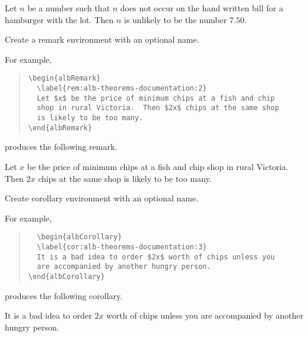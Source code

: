 \documentclass[11pt,a4paper,oneside,titlepage]{alb-corp}
\begin{document}
\begin{description}
  \begin{albLemma}
    \label{lem:alb-theorems-documentation:1}
    Let $n$ be a number such that $n$ does not occur on the hand written
    bill for a hamburger with the lot.  Then $n$ is unlikely to be the
    number $7.50$.
  \end{albLemma}

\item[\albLtxEnv{albRemark}\albLtxOpt{name}] Create a remark environment
  with an optional name.

  For example,
  \begin{quote}
\begin{verbatim}
\begin{albRemark}
  \label{rem:alb-theorems-documentation:2}
  Let $x$ be the price of minimum chips at a fish and chip
  shop in rural Victoria.  Then $2x$ chips at the same shop
  is likely to be too many.
\end{albRemark}
\end{verbatim}
  \end{quote}
  produces the following remark.

  \begin{albRemark}
    \label{rem:alb-theorems-documentation:2}
    Let $x$ be the price of minimum chips at a fish and chip shop in
    rural Victoria.  Then $2x$ chips at the same shop is likely to be
    too many.
  \end{albRemark}

\item[\albLtxEnv{albCorollary}\albLtxOpt{name}] Create corollary
  environment with an optional name.

  For example,
  \begin{quote}
\begin{verbatim}
  \begin{albCorollary}
  \label{cor:alb-theorems-documentation:3}
  It is a bad idea to order $2x$ worth of chips unless you
  are accompanied by another hungry person.
\end{albCorollary}
\end{verbatim}
  \end{quote}
  produces the following corollary.

  \begin{albCorollary}
    \label{cor:alb-theorems-documentation:3}
    It is a bad idea to order $2x$ worth of chips unless you are
    accompanied by another hungry person.
  \end{albCorollary}
\end{description}
\end{document}
